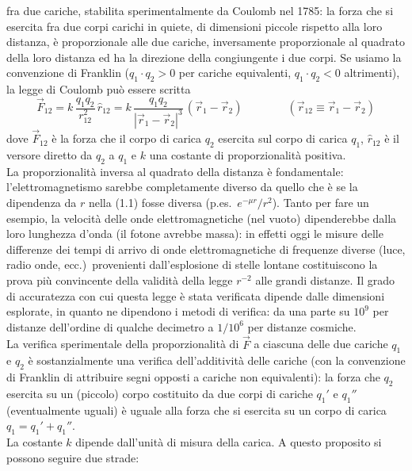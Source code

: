 fra due cariche, stabilita sperimentalmente da Coulomb nel 1785: la forza che si
esercita fra due corpi carichi in quiete, di dimensioni piccole rispetto alla
loro distanza, \`e proporzionale alle due cariche, inversamente proporzionale al
quadrato della loro distanza ed ha la direzione della congiungente i due corpi.
Se usiamo la convenzione di Franklin ($q_1\cdot q_2>0$ per cariche equivalenti,
$q_1\cdot q_2<0$ altrimenti), la legge di Coulomb pu\`o essere scritta
\begin{equation}
  \vec F_{12} = k\,\frac{q_1q_2}{r_{12}^2}\,\hat r_{12}
  = k\,\frac{q_1q_2}{|\vec r_1-\vec r_2|^3}\,(\vec r_1-\vec r_2)
  \qquad\qquad (\vec r_{12}\equiv\vec r_1-\vec r_2)
  \tag{1.1}
\end{equation}
dove $\vec F_{12}$ \`e la forza che il corpo di carica $q_2$ esercita sul corpo
di carica $q_1$, $\hat r_{12}$ \`e il versore diretto da $q_2$ a $q_1$ e $k$ una
costante di proporzionalit\`a positiva.\\
La proporzionalit\`a inversa al quadrato della distanza \`e fondamentale:
l'elettromagnetismo sarebbe completamente diverso da quello che \`e se la
dipendenza da $r$ nella (1.1) fosse diversa (p.es.\ $e^{-\mu r}/r^2$). Tanto per
fare un esempio, la velocit\`a delle onde elettromagnetiche (nel vuoto)
dipenderebbe dalla loro lunghezza d'onda (il fotone avrebbe massa): in effetti
oggi le misure delle differenze dei tempi di arrivo di onde elettromagnetiche di
frequenze diverse (luce, radio onde, ecc.)\ provenienti dall'esplosione di
stelle lontane costituiscono la prova pi\`u convincente della validit\`a della
legge $r^{-2}$ alle grandi distanze. Il grado di accuratezza con cui questa
legge \`e stata verificata dipende dalle dimensioni esplorate, in quanto ne
dipendono i metodi di verifica: da una parte su $10^9$ per distanze dell'ordine
di qualche decimetro a $1/10^6$ per distanze cosmiche.\\
La verifica sperimentale della proporzionalit\`a di $\vec F$ a ciascuna delle
due cariche $q_1$ e $q_2$ \`e sostanzialmente una verifica dell'additivit\`a
delle cariche (con la convenzione di Franklin di attribuire segni opposti a
cariche non equivalenti): la forza che $q_2$ esercita su un (piccolo) corpo
costituito da due corpi di cariche $q_1'$ e $q_1''$ (eventualmente uguali) \`e
uguale alla forza che si esercita su un corpo di carica $q_1=q_1'+q_1''$.\\
La costante $k$ dipende dall'unit\`a di misura della carica. A questo proposito
si possono seguire due strade:
